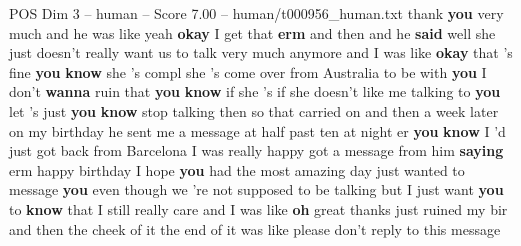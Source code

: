 \begin{textsample}{POS Dim 3 – human – Score 7.00 – human/t000956\_human.txt}  \label{ex:f3_pos_019}
thank \textbf{you} very much and he was like yeah \textbf{okay} I get that \textbf{erm} and then and he \textbf{said} well she just doesn't really want us to talk very much anymore and I was like \textbf{okay} that 's fine \textbf{you} \textbf{know} she 's compl she 's come over from Australia to be with \textbf{you} I don't \textbf{wanna} ruin that \textbf{you} \textbf{know} if she 's if she doesn't like me talking to \textbf{you} let 's just \textbf{you} \textbf{know} stop talking then so that carried on and then a week later on my birthday he sent me a message at half past ten at night er \textbf{you} \textbf{know} I 'd just got back from Barcelona I was really happy got a message from him \textbf{saying} erm happy birthday I hope \textbf{you} had the most amazing day just wanted to message \textbf{you} even though we 're not supposed to be talking but I just want \textbf{you} to \textbf{know} that I still really care and I was like \textbf{oh} great thanks just ruined my bir and then the cheek of it the end of it was like please don't reply to this message

\end{textsample}
